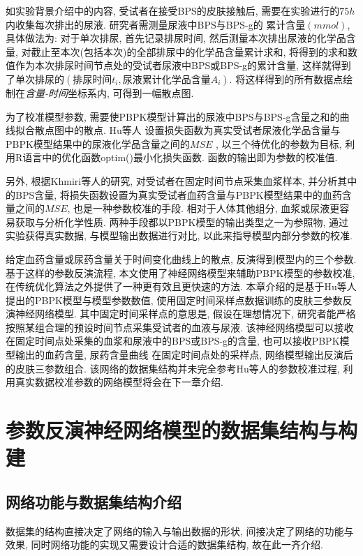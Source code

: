 \documentclass[a4paper,punct=banjiao,twoside]{ctexrep}
\theoremstyle{plain}
\theoremstyle{definition}
\theoremstyle{remark}
\begin{document}
如实验背景介绍中的内容, 受试者在接受BPS的皮肤接触后, 需要在实验进行的$75h$内收集每次排出的尿液\cite{11}. 研究者需测量尿液中BPS与BPS-g的
累计含量$(mmol)$, 具体做法为: 对于单次排尿, 首先记录排尿时间, 然后测量本次排出尿液的化学品含量, 对截止至本次(包括本次)的全部排尿中的化学品含量累计求和, 
将得到的求和数值作为本次排尿时间节点处的受试者尿液中BPS或BPS-g的累计含量, 这样就得到了单次排尿的$(\textit{排尿时间}t_i, \textit{尿液累计化学品含量}A_i)$. 
将这样得到的所有数据点绘制在\textit{含量-时间}坐标系内, 可得到一幅散点图. 

为了校准模型参数, 需要使PBPK模型计算出的尿液中BPS与BPS-g含量之和的曲线拟合散点图中的散点. Hu等人\cite{11} 设置损失函数为真实受试者尿液化学品含量与PBPK模型结果中的尿液化学品含量之间的$MSE$
, 以三个待优化的参数为目标, 利用R语言中的优化函数optim()最小化损失函数. 函数的输出即为参数的校准值. 

另外, 根据Khmiri等人\cite{13}的研究, 对受试者在固定时间节点采集血浆样本, 并分析其中的BPS含量, 将损失函数设置为真实受试者血药含量与PBPK模型结果中的血药含量之间的$MSE$, 也是一种参数校准的手段.
相对于人体其他组分, 血浆或尿液更容易获取与分析化学性质. 两种手段都以PBPK模型的输出类型之一为参照物, 通过实验获得真实数据, 与模型输出数据进行对比, 以此来指导模型内部分参数的校准.

给定血药含量或尿药含量关于时间变化曲线上的散点, 反演得到模型内的三个参数. 基于这样的参数反演流程, 本文使用了神经网络模型来辅助PBPK模型的参数校准, 在传统优化算法之外提供了一种更有效且更快速的方法.
本章介绍的是基于Hu等人\cite{11}提出的PBPK模型与模型参数数值, 使用固定时间采样点数据训练的皮肤三参数反演神经网络模型. 其中固定时间采样点的意思是, 
假设在理想情况下, 研究者能严格按照某组合理的预设时间节点采集受试者的血液与尿液. 该神经网络模型可以接收在固定时间点处采集的血浆和尿液中的BPS或BPS-g的含量, 也可以接收PBPK模型输出的血药含量, 尿药含量曲线
在固定时间点处的采样点, 网络模型输出反演后的皮肤三参数组合. 该网络的数据集结构并未完全参考Hu等人\cite{11}的参数校准过程, 利用真实数据校准参数的网络模型将会在下一章介绍.

\section{参数反演神经网络模型的数据集结构与构建}


\subsection{网络功能与数据集结构介绍}
数据集的结构直接决定了网络的输入与输出数据的形状, 间接决定了网络的功能与效果, 同时网络功能的实现又需要设计合适的数据集结构, 故在此一齐介绍.
\end{document}
